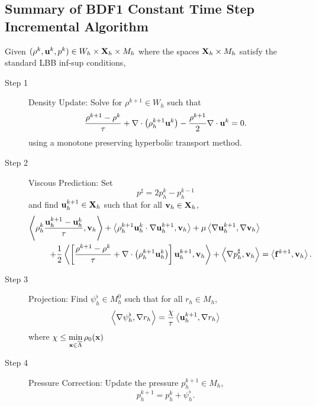 \documentclass[letterpaper]{erdc}
\begin{document}
%

%
%
\subsection{Summary of BDF1 Constant Time Step Incremental Algorithm}\label{subsec:BDF1constantTimeSummary}
Given $(\rho^{k}, \textbf{u}^{k}, p^{k})\in W_h\times \textbf{X}_h\times M_h$ where the spaces $\textbf{X}_h\times M_h$ satisfy the standard LBB inf-sup conditions, 
\begin{description}
  \item[Step 1] Density Update: Solve for $\rho^{k+1}\in W_h$ such that
\begin{equation}
  \frac{\rho^{k+1} - \rho^k}{\tau} + \nabla\cdot\left(\rho_h^{k+1}\textbf{u}^{k} \right) - \frac{\rho^{k+1}}{2}\nabla\cdot\textbf{u}^{k} = 0.
\end{equation}
using a monotone preserving hyperbolic transport method.  

\item[Step 2] Viscous Prediction: Set 
\begin{equation}\label{eq:pressureextrapolation_uniformtimestep}
  p^{\sharp} = 2p_h^{k} - p_h^{k-1}
\end{equation}
and find $\textbf{u}^{k+1}_h\in\textbf{X}_h$ such that for all $\textbf{v}_h\in\textbf{X}_h$,
\begin{equation}
  \begin{split}
\left\langle  \rho_h^{k}\frac{\textbf{u}_h^{k+1}-\textbf{u}_h^{k} }{\tau} , \textbf{v}_h \right\rangle + \left\langle  \rho_h^{k+1}\textbf{u}_h^{k}\cdot\nabla\textbf{u}_h^{k+1} , \textbf{v}_h \right\rangle + \mu\left\langle  \nabla \textbf{u}_h^{k+1} , \nabla\textbf{v}_h \right\rangle& \\
+ \frac{1}{2}\left\langle \left[\frac{\rho^{k+1}-\rho^{k}}{\tau} + \nabla\cdot\left(\rho_h^{k+1}\textbf{u}_h^{k}\right)\right]\textbf{u}_h^{k+1} , \textbf{v}_h \right\rangle +\left\langle \nabla p_h^{\sharp}, \textbf{v}_h \right\rangle &= \left\langle \mathbf{f}^{k+1}, \textbf{v}_h \right\rangle.
\end{split}
\end{equation}

\item[Step 3] Projection: Find $\psi_h^{\flat}\in M^0_h$ such that for all $r_h\in M_h$,
\begin{equation}
  \left\langle \nabla\psi_h^{\flat}, \nabla r_h \right\rangle = \frac{\chi}{\tau}\left\langle \textbf{u}_h^{k+1}, \nabla r_h \right\rangle
\end{equation}
where $\chi \leq \displaystyle\min_{\textbf{x}\in\overline{\Lambda}}\rho_0(\textbf{x})$ 

\item[Step 4] Pressure Correction: Update the pressure $p_h^{k+1}\in M_h$, 
\begin{equation}
p^{k+1}_h = p^{k}_h + \psi^{\flat}_h.
\end{equation}
\end{description}
\end{document}
